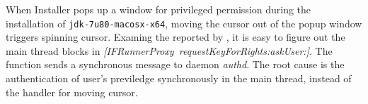 When Installer pops up a window for privileged permission during the
installation of \texttt{jdk-7u80-macosx-x64}, moving the cursor out of the popup
window triggers spinning cursor. Examing the \spinningnode reported by \xxx,
it is easy to figure out the main thread blocks in \textit{[IFRunnerProxy\
requestKeyForRights:askUser:]}. The function sends a synchronous message to
daemon \textit{authd}. The root cause is the authentication of user's previledge
synchronously in the main thread, instead of the handler for moving cursor.

